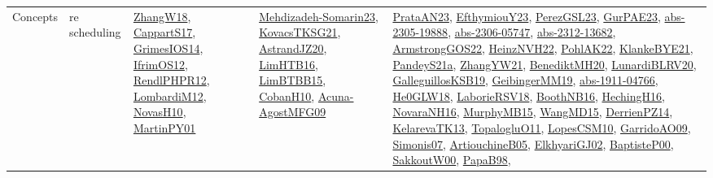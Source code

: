 {\begin{longtable}{llp{6cm}p{6cm}p{6cm}}
Concepts & re scheduling & \href{articles/ZhangW18.pdf}{ZhangW18}\cite{ZhangW18}, \href{papers/CappartS17.pdf}{CappartS17}\cite{CappartS17}, \href{articles/GrimesIOS14.pdf}{GrimesIOS14}\cite{GrimesIOS14}, \href{papers/IfrimOS12.pdf}{IfrimOS12}\cite{IfrimOS12}, \href{papers/RendlPHPR12.pdf}{RendlPHPR12}\cite{RendlPHPR12}, \href{articles/LombardiM12.pdf}{LombardiM12}\cite{LombardiM12}, \href{articles/NovasH10.pdf}{NovasH10}\cite{NovasH10}, \href{articles/MartinPY01.pdf}{MartinPY01}\cite{MartinPY01} & \href{papers/Mehdizadeh-Somarin23.pdf}{Mehdizadeh-Somarin23}\cite{Mehdizadeh-Somarin23}, \href{papers/KovacsTKSG21.pdf}{KovacsTKSG21}\cite{KovacsTKSG21}, \href{articles/AstrandJZ20.pdf}{AstrandJZ20}\cite{AstrandJZ20}, \href{papers/LimHTB16.pdf}{LimHTB16}\cite{LimHTB16}, \href{papers/LimBTBB15.pdf}{LimBTBB15}\cite{LimBTBB15}, \href{papers/CobanH10.pdf}{CobanH10}\cite{CobanH10}, \href{papers/Acuna-AgostMFG09.pdf}{Acuna-AgostMFG09}\cite{Acuna-AgostMFG09} & \href{articles/PrataAN23.pdf}{PrataAN23}\cite{PrataAN23}, \href{papers/EfthymiouY23.pdf}{EfthymiouY23}\cite{EfthymiouY23}, \href{papers/PerezGSL23.pdf}{PerezGSL23}\cite{PerezGSL23}, \href{articles/GurPAE23.pdf}{GurPAE23}\cite{GurPAE23}, \href{articles/abs-2305-19888.pdf}{abs-2305-19888}\cite{abs-2305-19888}, \href{articles/abs-2306-05747.pdf}{abs-2306-05747}\cite{abs-2306-05747}, \href{articles/abs-2312-13682.pdf}{abs-2312-13682}\cite{abs-2312-13682}, \href{papers/ArmstrongGOS22.pdf}{ArmstrongGOS22}\cite{ArmstrongGOS22}, \href{articles/HeinzNVH22.pdf}{HeinzNVH22}\cite{HeinzNVH22}, \href{articles/PohlAK22.pdf}{PohlAK22}\cite{PohlAK22}, \href{papers/KlankeBYE21.pdf}{KlankeBYE21}\cite{KlankeBYE21}, \href{articles/PandeyS21a.pdf}{PandeyS21a}\cite{PandeyS21a}, \href{articles/ZhangYW21.pdf}{ZhangYW21}\cite{ZhangYW21}, \href{articles/BenediktMH20.pdf}{BenediktMH20}\cite{BenediktMH20}, \href{articles/LunardiBLRV20.pdf}{LunardiBLRV20}\cite{LunardiBLRV20}, \href{papers/GalleguillosKSB19.pdf}{GalleguillosKSB19}\cite{GalleguillosKSB19}, \href{papers/GeibingerMM19.pdf}{GeibingerMM19}\cite{GeibingerMM19}, \href{articles/abs-1911-04766.pdf}{abs-1911-04766}\cite{abs-1911-04766}, \href{papers/He0GLW18.pdf}{He0GLW18}\cite{He0GLW18}, \href{articles/LaborieRSV18.pdf}{LaborieRSV18}\cite{LaborieRSV18}, \href{papers/BoothNB16.pdf}{BoothNB16}\cite{BoothNB16}, \href{papers/HechingH16.pdf}{HechingH16}\cite{HechingH16}, \href{articles/NovaraNH16.pdf}{NovaraNH16}\cite{NovaraNH16}, \href{papers/MurphyMB15.pdf}{MurphyMB15}\cite{MurphyMB15}, \href{articles/WangMD15.pdf}{WangMD15}\cite{WangMD15}, \href{papers/DerrienPZ14.pdf}{DerrienPZ14}\cite{DerrienPZ14}, \href{papers/KelarevaTK13.pdf}{KelarevaTK13}\cite{KelarevaTK13}, \href{articles/TopalogluO11.pdf}{TopalogluO11}\cite{TopalogluO11}, \href{articles/LopesCSM10.pdf}{LopesCSM10}\cite{LopesCSM10}, \href{articles/GarridoAO09.pdf}{GarridoAO09}\cite{GarridoAO09}, \href{articles/Simonis07.pdf}{Simonis07}\cite{Simonis07}, \href{papers/ArtiouchineB05.pdf}{ArtiouchineB05}\cite{ArtiouchineB05}, \href{papers/ElkhyariGJ02.pdf}{ElkhyariGJ02}\cite{ElkhyariGJ02}, \href{articles/BaptisteP00.pdf}{BaptisteP00}\cite{BaptisteP00}, \href{articles/SakkoutW00.pdf}{SakkoutW00}\cite{SakkoutW00}, \href{articles/PapaB98.pdf}{PapaB98}\cite{PapaB98}, 
\end{longtable}}
